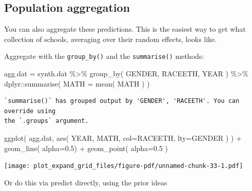 \documentclass[
  letterpaper,
  DIV=11,
  numbers=noendperiod]{scrreprt}
\newenvironment{Shaded}{}{}
\newcommand{\AttributeTok}[1]{\textcolor[rgb]{0.49,0.56,0.16}{#1}}
\newcommand{\DecValTok}[1]{\textcolor[rgb]{0.25,0.63,0.44}{#1}}
\newcommand{\FloatTok}[1]{\textcolor[rgb]{0.25,0.63,0.44}{#1}}
\newcommand{\FunctionTok}[1]{\textcolor[rgb]{0.02,0.16,0.49}{#1}}
\newcommand{\NormalTok}[1]{#1}
\newcommand{\OtherTok}[1]{\textcolor[rgb]{0.00,0.44,0.13}{#1}}
\newcommand{\SpecialCharTok}[1]{\textcolor[rgb]{0.25,0.44,0.63}{#1}}
\begin{document}
\subsection{Population aggregation}\label{population-aggregation}

You can also aggregate these predictions. This is the easiest way to get
what collection of schools, averaging over their random effects, looks
like.

Aggregate with the \texttt{group\_by()} and the \texttt{summarise()}
methods:

\begin{Shaded}
\begin{Highlighting}[]
\NormalTok{agg.dat }\OtherTok{=}\NormalTok{ synth.dat }\SpecialCharTok{\%\textgreater{}\%} \FunctionTok{group\_by}\NormalTok{( GENDER, RACEETH, YEAR ) }\SpecialCharTok{\%\textgreater{}\%}
\NormalTok{  dplyr}\SpecialCharTok{::}\FunctionTok{summarise}\NormalTok{( }\AttributeTok{MATH =} \FunctionTok{mean}\NormalTok{( MATH ) )}
\end{Highlighting}
\end{Shaded}

\begin{verbatim}
`summarise()` has grouped output by 'GENDER', 'RACEETH'. You can override using
the `.groups` argument.
\end{verbatim}

\begin{Shaded}
\begin{Highlighting}[]
\FunctionTok{ggplot}\NormalTok{( agg.dat, }\FunctionTok{aes}\NormalTok{( YEAR, MATH, }\AttributeTok{col=}\NormalTok{RACEETH, }\AttributeTok{lty=}\NormalTok{GENDER ) ) }\SpecialCharTok{+}
  \FunctionTok{geom\_line}\NormalTok{( }\AttributeTok{alpha=}\FloatTok{0.5}\NormalTok{) }\SpecialCharTok{+} \FunctionTok{geom\_point}\NormalTok{( }\AttributeTok{alpha=}\FloatTok{0.5}\NormalTok{ )}
\end{Highlighting}
\end{Shaded}

\texttt{[image: plot\_expand\_grid\_files/figure-pdf/unnamed-chunk-33-1.pdf]}

Or do this via predict directly, using the prior ideas

\begin{Shaded}
\end{Shaded}
\end{document}
